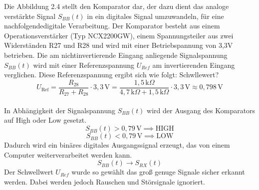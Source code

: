 Die Abbildung 2.4 stellt den Komparator dar, der dazu dient das analoge verstärkte Signal $S_{BB}(t)$ in ein digitales Signal umzuwandeln, für
eine nachfolgendedigitale Verarbeitung. Der Komparator besteht aus einem Operationsverstärker (Typ NCX2200GW), einem Spannungsteiler aus zwei Widerständen
R27 und R28 und wird mit einer Betriebspannung von 3,3V betrieben. Die am nichtinvertierende Eingang anliegende Signalspannung $S_{BB}(t)$ wird mit
einer Referenzspannung $U_{Ref}$ am invertierenden Eingang verglichen. Diese Referenzspannung ergibt sich wie folgt:  Schwllewert?
\\
\begin{equation}
    U_{\text{Ref}} = \frac{R_{28}}{R_{27} + R_{28}} \cdot 3{,}3\,\text{V}
    = \frac{1{,}5\,\text{k}\Omega}{4{,}7\,\text{k}\Omega + 1{,}5\,\text{k}\Omega} \cdot 3{,}3\,\text{V}
    \approx 0{,}798\,\text{V}
\end{equation}\\
In Abhängigkeit der Signalspannung $S_{BB}(t)$ wird der Ausgang des Komparators auf High oder Low gesetzt.
\[
S_{BB}(t) > 0{,}79\,\mathrm{V} \implies \text{HIGH}
\]
\[
S_{BB}(t) < 0{,}79\,\mathrm{V} \implies \text{LOW}
\]
Dadurch wird ein binäres digitales Ausgangssignal erzeugt, das von einem Computer weiterverarbeitet werden kann.
\[
S_{BB}(t) \rightarrow S_{RX}(t)
\]
Der Schwellwert $U_{Ref}$ wurde so gewählt das groß genuge Signale sicher erkannt werden. Dabei werden jedoch Rauschen und Störsignale ignoriert.